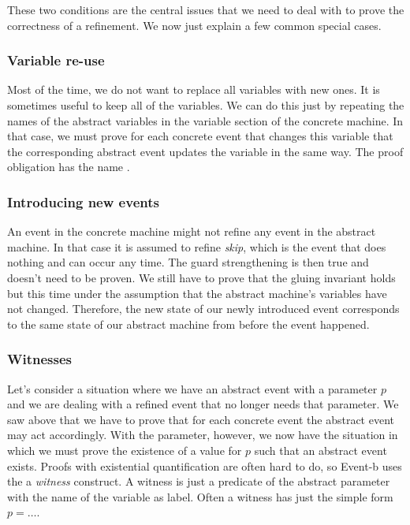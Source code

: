 These two conditions are the central issues that we need to deal with to prove the correctness of a refinement. We now just explain a few
common special cases.

\subsubsection{Variable re-use}
\label{tut_variable_reuse}
Most of the time, we do not want to replace all variables with new ones. It is sometimes useful to keep all of the variables.
We can do this just by repeating the names of the abstract variables in the variable section of the concrete
machine. In that case, we must prove for each concrete event that changes this variable that the corresponding 
abstract event updates the variable in the same way.
The proof obligation has the name .

\subsubsection{Introducing new events}
\label{tut_skip}
An event in the concrete machine might not refine any event in the abstract machine. In that case it is assumed
to refine \emph{skip}, which is the event that does nothing and can occur any time. 
The guard strengthening is then true and doesn't need to be proven.
We still have to prove that the gluing invariant holds but this time under the assumption that the abstract machine's
variables have not changed. Therefore, the new state of our newly introduced event corresponds to the same state of
our abstract machine from before the event happened.

\subsubsection{Witnesses}
\label{tut_witnesses}
Let's consider a situation where we have an abstract event with a parameter $p$ and we are dealing with a refined event that no longer needs that parameter.
We saw above that we have to prove that for each concrete event the abstract event may act accordingly.
With the parameter, however, we now have the situation in which we must prove the existence of a value for $p$ such
that an abstract event exists. Proofs with existential quantification are often hard to do, so Event-b 
uses the a \emph{witness} construct. A witness is just a predicate of the abstract parameter with the
name of the variable as label. Often a witness has just the simple form $p = \ldots$.


